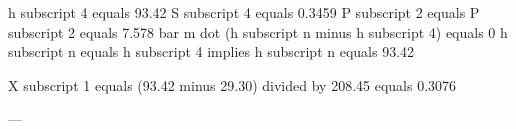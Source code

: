 h subscript 4 equals 93.42  
S subscript 4 equals 0.3459  
P subscript 2 equals P subscript 2 equals 7.578 bar  
m dot (h subscript n minus h subscript 4) equals 0  
h subscript n equals h subscript 4 implies h subscript n equals 93.42  

X subscript 1 equals (93.42 minus 29.30) divided by 208.45 equals 0.3076  

---